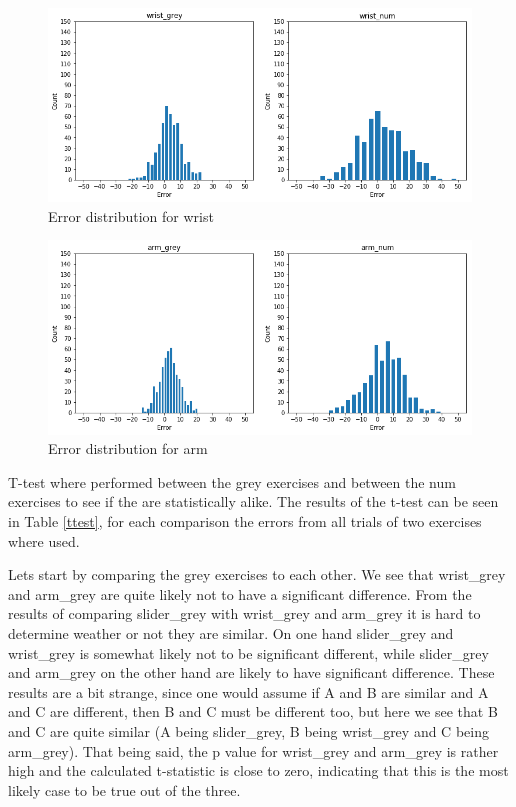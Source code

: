 \begin{figure}[p]
    \centering
    \includegraphics[width=1\textwidth]{figures/error_dist2.png}
    \caption{Error distribution for wrist}
    \label{error_dist2}
\end{figure}

\begin{figure}[p]
    \centering
    \includegraphics[width=1\textwidth]{figures/error_dist3.png}
    \caption{Error distribution for arm}
    \label{error_dist3}
\end{figure}

T-test where performed between the grey exercises and between the num exercises to see if the are statistically alike. The results of the t-test can be seen in Table \ref{ttest}, for each comparison the errors from all trials of two exercises where used.

Lets start by comparing the grey exercises to each other. We see that wrist\_grey and arm\_grey are quite likely not to have a significant difference. From the results of comparing slider\_grey with wrist\_grey and arm\_grey it is hard to determine weather or not they are similar. On one hand slider\_grey and wrist\_grey is somewhat likely not to be significant different, while slider\_grey and arm\_grey on the other hand are likely to have significant difference. These results are a bit strange, since one would assume if A and B are similar and A and C are different, then B and C must be different too, but here we see that B and C are quite similar (A being slider\_grey, B being wrist\_grey and C being arm\_grey). That being said, the p value for wrist\_grey and arm\_grey is rather high and the calculated t-statistic is close to zero, indicating that this is the most likely case to be true out of the three.

